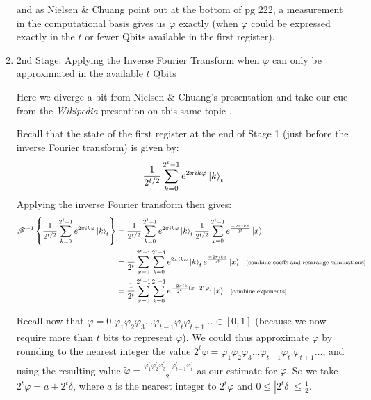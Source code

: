\documentclass{article}
\begin{document}
\begin{enumerate}[label=\textbf{(\arabic*)}]
and as Nielsen \& Chuang point out at the bottom of pg 222, a measurement in the computational basis gives us $\varphi$ exactly (when $\varphi$ could be expressed exactly in the $t$ or fewer Qbits available in the first register).


\item 2nd Stage: Applying the Inverse Fourier Transform when $\varphi$ can only be approximated in the available $t$ Qbits

\vspace{0.1in}

Here we diverge a bit from Nielsen \& Chuang's presentation and take our cue from the \textit{Wikipedia} presention on this same topic \cite{wikipedia:qpe}.

Recall that the state of the first register at the end of Stage 1 (just before the inverse Fourier transform) is given by:
\begin{align}
    \frac{1}{2^{t/2}}
      \sum_{k=0}^{2^t-1}
      e^{2\pi i k\varphi}\ket{k}_{t}
\end{align}
Applying the inverse Fourier transform then gives:
\begin{align}
    \mathscr{F}^{-1}\left\{\frac{1}{2^{t/2}}
      \sum_{k=0}^{2^t-1}
      e^{2\pi i k\varphi}\ket{k}_{t}\right\}
      &=
      \frac{1}{2^{t/2}}
      \sum_{k=0}^{2^t-1}
      e^{2\pi i k\varphi}\ket{k}_{t}
      \frac{1}{2^{t/2}}
      \sum_{x=0}^{2^t-1}
      e^{\frac{-2\pi i kx}{2^t}} \ket{x}\\
      &=
      \frac{1}{2^t}
      \sum_{x=0}^{2^t-1}
      \sum_{k=0}^{2^t-1}
      e^{2\pi i k\varphi}\ket{k}_{t}
      e^{\frac{-2\pi i kx}{2^t}} \ket{x} \hspace{0.1in}\text{\scriptsize [combine coeffs and rearrange summations]}\\
      &=
      \frac{1}{2^t}
      \sum_{x=0}^{2^t-1}
      \sum_{k=0}^{2^t-1}
      e^{\frac{-2\pi i k}{2^t}(x-2^{t}\varphi)} \ket{x} \hspace{0.1in}\text{\scriptsize [combine exponents]}
\end{align}

Recall now that $\varphi = 0.\varphi_{1}\varphi_{2}\varphi_{3}\ldots\varphi_{t-1}\varphi_{t}\varphi_{t+1}\ldots \in [0, 1]$ (because we now require more than $t$ bits to represent $\varphi$). We could thus approximate $\varphi$ by rounding to the nearest integer the value $2^t\varphi = \varphi_{1}\varphi_{2}\varphi_{3}\ldots\varphi_{t-1}\varphi_{t}.\varphi_{t+1}\ldots$, and using the resulting value $\tilde{\varphi} = \frac{\varphi_{1}^{\prime}\varphi_{2}^{\prime}\varphi_{3}^{\prime}\ldots\varphi_{t-1}^{\prime}\varphi_{t}^{\prime}}{2^t}$ as our estimate for $\varphi$. So we take $2^t\varphi = a + 2^t\delta$, where $a$ is the nearest integer to $2^t\varphi$ and $0 \le |2^t\delta| \le \frac{1}{2}$.


\end{enumerate}
\end{document}
